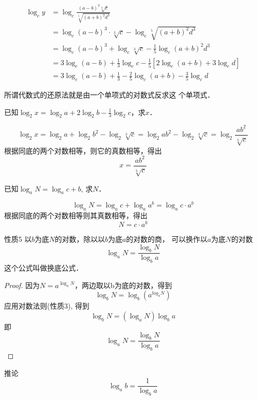 \begin{solution}
\[\begin{split}
    \log_c y&=\log_c \frac{(a-b)^3\sqrt[3]{c}}{\sqrt[5]{(a+b)^2d^3}}\\ 
&=\log_c (a-b)^3\cdot \sqrt[3]{c}  -\log_c \sqrt[5]{(a+b)^2d^3}\\
&=\log_c (a-b)^3+ \log_c \sqrt[3]{c}  -\frac{1}{5}\log_c {(a+b)^2d^3}\\
&=3\log_c (a-b)+\frac{1}{3}\log_c  c-\frac{1}{5}[2\log_c (a+b)+3\log_c d]\\
&=3\log_c (a-b)+\frac{1}{3}-\frac{2}{5}\log_c (a+b)-\frac{3}{5}\log_c d
\end{split}\]
\end{solution}

所谓代数式的还原法就是由一个单项式的对数式反求这
个单项式．

\begin{example}
已知$\log_2 x=\log_2 a+2\log_2 b-\frac{1}{3}\log_2 c$，求$x$．
\end{example}

\begin{solution}
    \[\log_2 x=\log_2 a+\log_2 b^2-\log_2 \sqrt[3]{c}=\log_2 ab^2-\log_2 \sqrt[3]{c}
=\log_2 \frac{ab^2}{\sqrt[3]{c}}\]
根据同底的两个对数相等，则它的真数相等，得出
\[x=\frac{ab^2}{\sqrt[3]{c}}\]
\end{solution}    


\begin{example}
    已知$\log_a N=\log_ac+b$, 求$N$．
\end{example}


\begin{solution}
\[\log_a N=\log_a c+\log_a a^b=\log_a c\cdot a^b\]
根据同底的两个对数相等则其真数相等，得出
\[N=c\cdot a^b\] 
\end{solution}

\begin{blk}{性质5}
    以$b$为底$N$的对数，除以以$b$为底$a$的对数的商，
可以换作以$a$为底$N$的对数
\[\log_a N=\frac{\log_b N}{\log_b a}\]
这个公式叫做换底公式．
\end{blk}


\begin{proof}
    因为$N=a^{\log_a N}$，两边取以b为底的对数，得到
    \[\log_b N = \log_b (a^{log_aN} )\]
    应用对数法则(性质3), 得到
\[\log_b N=(\log_a N)\log_ba\]
即
\[\log_a N=\frac{\log_b N}{\log_b a}\]

\end{proof}


\begin{blk}{推论}
    $$\log_ab=\frac{1}{\log_ba}$$
\end{blk}



